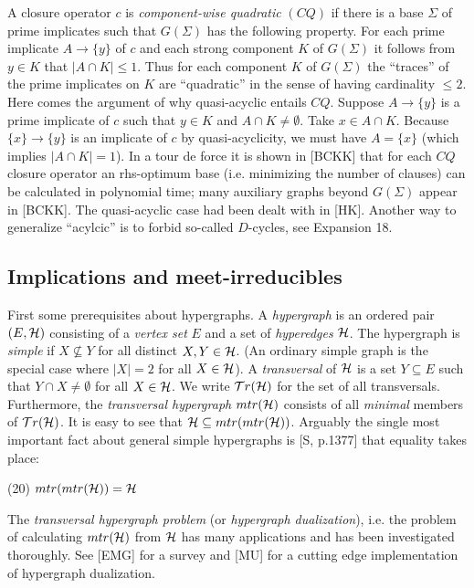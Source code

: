 \documentclass[11pt]{article}
\newcommand{\ra}{\rightarrow}
\begin{document}
A closure operator $c$ is {\it component-wise quadratic} $(CQ)$ if there is a base $\Sigma$ of prime implicates such that $G(\Sigma)$ has the following property. For each prime implicate $A \ra \{y\}$ of $c$ and each strong component $K$ of $G(\Sigma)$ it follows from $y \in K$ that $|A \cap K| \leq 1$. Thus for each component $K$ of $G(\Sigma)$ the ``traces'' of the prime implicates on $K$ are ``quadratic'' in the sense of having cardinality $\leq 2$. Here comes the argument of why quasi-acyclic entails $CQ$. Suppose $A \ra \{y\}$ is a prime implicate of $c$ such that $y \in K$ and $A \cap K \neq \emptyset$. Take $x \in A \cap K$. Because $\{x\} \ra \{y\}$ is an implicate of $c$ by quasi-acyclicity, we must have $A = \{x\}$ (which implies $|A\cap K|=1$).  In a tour de force it is shown in [BCKK] that for each $CQ$ closure operator an rhs-optimum base (i.e. minimizing the number of clauses) can be calculated in polynomial time; many auxiliary graphs beyond $G(\Sigma)$ appear in [BCKK]. The quasi-acyclic case had been dealt with in [HK]. Another way to generalize ``acylcic'' is to forbid so-called $D$-cycles, see Expansion 18.




\subsection{Implications and meet-irreducibles}

First some prerequisites about hypergraphs.
A {\it hypergraph} is an ordered pair $(E, {\cal H})$ consisting of a {\it vertex set} $E$ and  a set of {\it hyperedges} ${\cal H}$. The hypergraph is {\it simple} if $X \not\subseteq Y$ for all distinct $X,Y \in {\cal H}$. (An ordinary simple graph is the special case where $|X| = 2$ for all $X \in {\cal H}$). A {\it transversal} of ${\cal H}$ is a set $Y \subseteq E$ such that $Y \cap X \neq \emptyset$ for all $X \in {\cal H}$. We write ${\cal T}r({\cal H})$ for the set of all transversals. Furthermore, the {\it transversal hypergraph} $mtr({\cal H})$ consists of all {\it minimal} members of  ${\cal T}r({\cal H})$. It is easy to see that ${\cal H} \subseteq mtr(mtr({\cal H}))$. Arguably the single most important fact about general simple hypergraphs is [S, p.1377] that equality takes place:

(20) \quad $mtr(mtr({\cal H})) = {\cal H}$

The {\it transversal hypergraph problem} (or {\it hypergraph dualization}), i.e. the problem of calculating $mtr({\cal H})$ from ${\cal H}$ has many applications and has been investigated thoroughly. See [EMG] for a survey and [MU] for a cutting edge implementation of hypergraph dualization.
\end{document}
